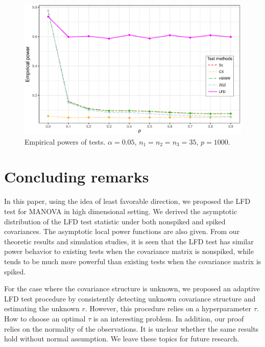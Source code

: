 \documentclass[12pt]{article} %
\theoremstyle{definition}
\begin{document}
\begin{figure}[htbp]
    \centering
    \includegraphics[width=\textwidth]{figure1}
    \caption{Empirical powers of tests. $\alpha=0.05$, $n_1=n_2=n_3=35$, $p=1000$.}\label{figure1}
\end{figure}





\section{Concluding remarks}\label{concluding}
In this paper, using the idea of least favorable direction, we proposed the LFD test for MANOVA in high dimensional setting.
We derived the asymptotic distribution of the LFD test statistic under both nonspiked and spiked covariances.
The asymptotic local power functions are also given.
From our theoretic results and simulation studies, it is seen that the LFD test has similar power behavior to existing tests when the covariance matrix is nonspiked, while tends to be much more powerful than existing tests when the covariance matrix is spiked.

For the case where the covariance structure is unknown,
we proposed an adaptive LFD test procedure by consistently detecting unknown covariance structure and estimating the unknown $r$.
However, this procedure relies on a hyperparameter $\tau$. 
How to choose an optimal $\tau$ is an interesting problem.
In addition, our proof relies on the normality of the observations.
It is unclear whether the same results hold without normal assumption.
We leave these topics for future research.
\end{document}
